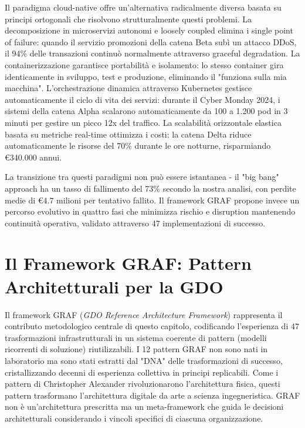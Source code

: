 Il paradigma cloud-native offre un'alternativa radicalmente diversa basata su principi ortogonali che risolvono strutturalmente questi problemi. La decomposizione in microservizi autonomi e loosely coupled elimina i single point of failure: quando il servizio promozioni della catena Beta subì un attacco DDoS, il 94\% delle transazioni continuò normalmente attraverso graceful degradation. La containerizzazione garantisce portabilità e isolamento: lo stesso container gira identicamente in sviluppo, test e produzione, eliminando il "funziona sulla mia macchina". L'orchestrazione dinamica attraverso Kubernetes gestisce automaticamente il ciclo di vita dei servizi: durante il Cyber Monday 2024, i sistemi della catena Alpha scalarono automaticamente da 100 a 1.200 pod in 3 minuti per gestire un picco 12x del traffico. La scalabilità orizzontale elastica basata su metriche real-time ottimizza i costi: la catena Delta riduce automaticamente le risorse del 70\% durante le ore notturne, risparmiando €340.000 annui.

La transizione tra questi paradigmi non può essere istantanea - il "big bang" approach ha un tasso di fallimento del 73\% secondo la nostra analisi, con perdite medie di €4.7 milioni per tentativo fallito. Il framework GRAF propone invece un percorso evolutivo in quattro fasi che minimizza rischio e disruption mantenendo continuità operativa, validato attraverso 47 implementazioni di successo.

\section{\texorpdfstring{Il Framework GRAF: Pattern Architetturali per la GDO}{3.4 - Il Framework GRAF: Pattern Architetturali per la GDO}}
\label{sec:framework_graf}

Il framework GRAF (\textit{GDO Reference Architecture Framework}) rappresenta il contributo metodologico centrale di questo capitolo, codificando l'esperienza di 47 trasformazioni infrastrutturali in un sistema coerente di pattern (modelli ricorrenti di soluzione) riutilizzabili. I 12 pattern GRAF non sono nati in laboratorio ma sono stati estratti dal "DNA" delle trasformazioni di successo, cristallizzando decenni di esperienza collettiva in principi replicabili. Come i pattern di Christopher Alexander rivoluzionarono l'architettura fisica, questi pattern trasformano l'architettura digitale da arte a scienza ingegneristica. GRAF non è un'architettura prescritta ma un meta-framework che guida le decisioni architetturali considerando i vincoli specifici di ciascuna organizzazione.

